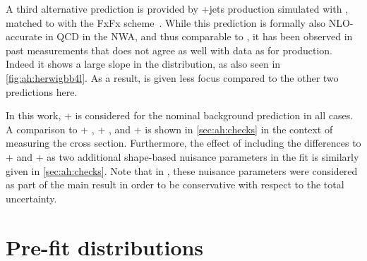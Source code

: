 A third alternative prediction is provided by \ttbar+jets production simulated with \amcatnlo, matched to \pythia with the FxFx scheme~\cite{Frederix:2012ps}. While this prediction is formally also NLO-accurate in QCD in the NWA, and thus comparable to \powheg \hvq, it has been observed in past measurements that \amcatnlo does not agree as well with data as \powheg for \ttbar production. Indeed it shows a large slope in the \mtt distribution, as also seen in \cref{fig:ah:herwigbb4l}. As a result, \amcatnlo is given less focus compared to the other two predictions here.

In this work, \powheg \hvq + \pythia is considered for the nominal background prediction in all cases. A comparison to \powheg \hvq + \herwig, \amcatnlo + \pythia, and \bbfourl + \pythia is shown in \cref{sec:ah:checks} in the context of measuring the \etat cross section. Furthermore, the effect of including the differences to \powheg \hvq + \herwig and \bbfourl + \pythia as two additional shape-based nuisance parameters in the fit is similarly given in \cref{sec:ah:checks}. Note that in , these nuisance parameters were considered as part of the main result in order to be conservative with respect to the total uncertainty.

\section{Pre-fit distributions}
\label{sec:ah:prefit}

